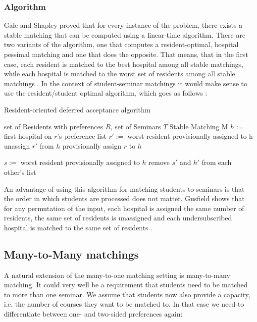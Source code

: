 \subsubsection{Algorithm}
Gale and Shapley \cite{GaleShapleyOrig} proved that for every instance of the problem, there exists a stable matching that can be computed using a linear-time algorithm. There are two variants of the algorithm, one that computes a resident-optimal, hospital pessimal matching and one that does the opposite. That means, that in the first case, each resident is matched to the best hospital among all stable matchings, while each hospital is matched to the worst set of residents among all stable matchings \cite{Gusfield}. In the context of student-seminar matchings it would make sense to use the resident/student optimal algorithm, which goes as follows \cite{Gusfield}:
\begin{algorithm} %
    \caption{Resident-oriented deferred acceptance algorithm} 
    \label{alg:resident-oriented-algorithm} 
    \begin{algorithmic} %
        \Require set of Residents with preferences $R$, set of Seminars $T$
        \Ensure Stable Matching M
        \State $h:=$ first hospital on $r$'s preference list
            \State $r':=$ worst resident provisionally assigned to h
            \State unassign $r'$ from $h$
        \EndIf
        \State provisionally assign $r$ to $h$

            $s:=$ worst resident provisionally assigned to $h$
                \State remove $s'$ and $h'$ from each other's list
            \EndFor
        \EndIf

        \EndWhile
    \end{algorithmic}
\end{algorithm}

An advantage of using this algorithm for matching students to seminars is that the order in which students are processed does not matter. Gusfield shows that for any permutation of the input, each hospital is assigned the same number of residents, the same set of residents is unassigned and each undersubscribed hospital is matched to the same set of residents \cite{Gusfield}.

\subsection{Many-to-Many matchings}
A natural extension of the many-to-one matching setting is many-to-many matching. It could very well be a requirement that students need to be matched to more than one seminar. We assume that students now also provide a capacity, i.e. the number of courses they want to be matched to. In that case we need to differentiate between one- and two-sided preferences again:

